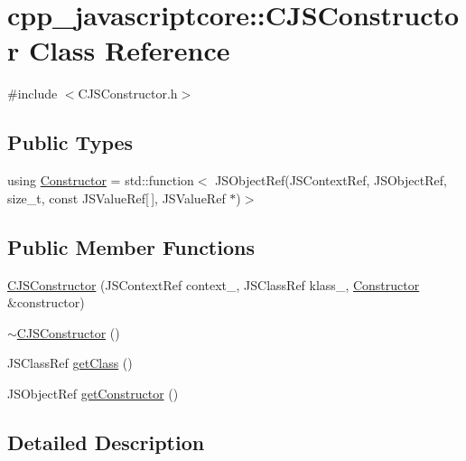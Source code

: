 \hypertarget{classcpp__javascriptcore_1_1_c_j_s_constructor}{}\section{cpp\+\_\+javascriptcore\+:\+:C\+J\+S\+Constructor Class Reference}
\label{classcpp__javascriptcore_1_1_c_j_s_constructor}


{\ttfamily \#include $<$C\+J\+S\+Constructor.\+h$>$}

\subsection*{Public Types}
\begin{DoxyCompactItemize}
\item 
using \mbox{\hyperlink{classcpp__javascriptcore_1_1_c_j_s_constructor_aeeebb95fa01f05a9f0793ed7b176e759}{Constructor}} = std\+::function$<$ J\+S\+Object\+Ref(J\+S\+Context\+Ref, J\+S\+Object\+Ref, size\+\_\+t, const J\+S\+Value\+Ref\mbox{[}$\,$\mbox{]}, J\+S\+Value\+Ref $\ast$)$>$
\end{DoxyCompactItemize}
\subsection*{Public Member Functions}
\begin{DoxyCompactItemize}
\item 
\mbox{\hyperlink{classcpp__javascriptcore_1_1_c_j_s_constructor_aa7487dce0f60a47ace1056f8218d2128}{C\+J\+S\+Constructor}} (J\+S\+Context\+Ref context\+\_\+, J\+S\+Class\+Ref klass\+\_\+, \mbox{\hyperlink{classcpp__javascriptcore_1_1_c_j_s_constructor_aeeebb95fa01f05a9f0793ed7b176e759}{Constructor}} \&constructor)
\item 
\mbox{\hyperlink{classcpp__javascriptcore_1_1_c_j_s_constructor_aba23ba6a23a67ab76adb851536ac5394}{$\sim$\+C\+J\+S\+Constructor}} ()
\item 
J\+S\+Class\+Ref \mbox{\hyperlink{classcpp__javascriptcore_1_1_c_j_s_constructor_a3ad524ec0305f3709842e451fc7c684c}{get\+Class}} ()
\item 
J\+S\+Object\+Ref \mbox{\hyperlink{classcpp__javascriptcore_1_1_c_j_s_constructor_ad2fabad070c8a98d05c56bbc83f0705a}{get\+Constructor}} ()
\end{DoxyCompactItemize}


\subsection{Detailed Description}


